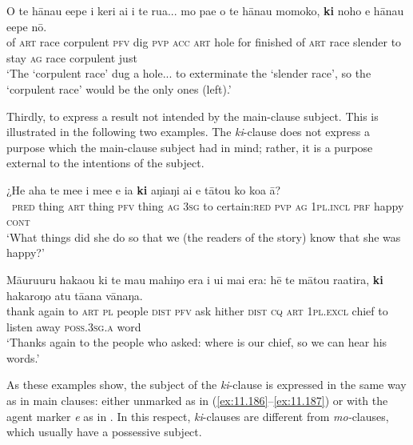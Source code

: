 \largerpage

\ea\label{ex:11.189}
\gll O te hānau {\ꞌ}e{\ꞌ}epe i keri ai i te rua...  mo pae o te hānau momoko, \textbf{ki} noho e hānau {\ꞌ}e{\ꞌ}epe nō.\\
of \textsc{art} race corpulent \textsc{pfv} dig \textsc{pvp} \textsc{acc} \textsc{art} hole  for finished of \textsc{art} race slender to stay \textsc{ag} race corpulent just\\

\glt 
‘The ‘corpulent race’ dug a hole... to exterminate the ‘slender race’, so the ‘corpulent race’ would be the only ones (left).’ \textstyleExampleref{[Ley-3-06.019]}
\z

Thirdly, to express a result not intended by the main-clause subject. This is illustrated in the following two examples. The \textit{ki}{}-clause does not express a purpose which the main-clause subject had in mind; rather, it is a purpose external to the intentions of the subject.

\ea\label{ex:11.190}
\gll ¿He aha te me{\ꞌ}e i me{\ꞌ}e e ia \textbf{ki} aŋiaŋi ai e tātou ko koa {\ꞌ}ā?\\
~\textsc{pred} thing \textsc{art} thing \textsc{pfv} thing \textsc{ag} \textsc{3sg} to certain:\textsc{red} \textsc{pvp} \textsc{ag} \textsc{1pl.incl} \textsc{prf} happy \textsc{cont}\\

\glt 
‘What things did she do so that we (the readers of the story) know that she was happy?’ \textstyleExampleref{[R615.658]} 
\z

\ea\label{ex:11.191}
\gll Māuruuru haka{\ꞌ}ou ki te mau mahiŋo era i {\ꞌ}ui mai era: hē te mātou ra{\ꞌ}atira, \textbf{ki} hakaroŋo atu tā{\ꞌ}ana vānaŋa.\\
thank again to \textsc{art} \textsc{pl} people \textsc{dist} \textsc{pfv} ask hither \textsc{dist} \textsc{cq} \textsc{art} \textsc{1pl.excl} chief to listen away \textsc{poss.3sg.a} word\\

\glt
‘Thanks again to the people who asked: where is our chief, so we can hear his words.’ \textstyleExampleref{[R205.044]} 
\z

As these examples show, the subject of the \textit{ki}{}-clause is expressed in the same way as in main clauses: either unmarked as in (\ref{ex:11.186}–\ref{ex:11.187}) or with the agent marker \textit{e} as in . In this respect, \textit{ki}{}-clauses are different from \textit{mo-}clauses, which usually have a possessive subject.

